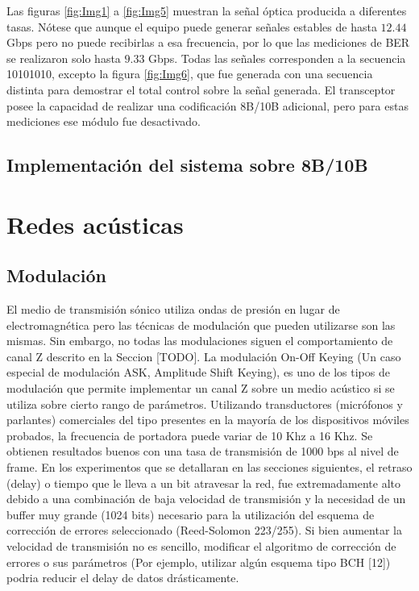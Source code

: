 Las figuras \ref{fig:Img1} a \ref{fig:Img5} muestran la señal óptica producida a diferentes
tasas. Nótese que aunque el equipo puede generar señales estables de
hasta $12.44$ Gbps pero no puede recibirlas a esa frecuencia, por lo que las
mediciones de BER se realizaron solo hasta $9.33$ Gbps. Todas las señales
corresponden a la secuencia 10101010, excepto la figura \ref{fig:Img6},
que fue generada con una secuencia distinta para demostrar el total
control sobre la señal generada. El transceptor posee la capacidad de
realizar una codificación 8B/10B adicional, pero para estas mediciones
ese módulo fue desactivado.



\subsection{Implementación del sistema sobre 8B/10B}
\section{Redes acústicas}

\subsection{Modulación}
El medio de transmisión sónico utiliza ondas de presión en lugar de electromagnética pero las técnicas de modulación que pueden utilizarse son las mismas.
Sin embargo, no todas las modulaciones siguen el comportamiento de canal Z descrito en la Seccion [TODO].
La modulación On-Off Keying (Un caso especial de modulación ASK, Amplitude Shift Keying), es uno de los tipos de modulación que permite implementar un canal Z sobre un medio acústico si se utiliza sobre cierto rango de parámetros. Utilizando transductores (micrófonos y parlantes) comerciales del tipo presentes en la mayoría de los dispositivos móviles probados, la frecuencia de portadora puede variar de 10 Khz a 16 Khz. Se obtienen resultados buenos con una tasa de transmisión de 1000 bps al nivel de frame. En los experimentos que se detallaran en las secciones siguientes, el retraso (delay) o tiempo que le lleva a un bit atravesar la red, fue extremadamente alto debido a una combinación de baja velocidad de transmisión y la necesidad de un buffer muy grande (1024 bits) necesario para la utilización del esquema de corrección de errores seleccionado (Reed-Solomon 223/255). Si bien aumentar la velocidad de transmisión no es sencillo, modificar el algoritmo de corrección de errores o sus parámetros (Por ejemplo, utilizar algún esquema tipo BCH [12]) podria reducir el delay de datos drásticamente.

